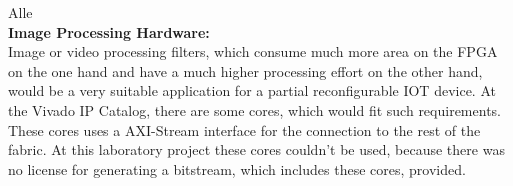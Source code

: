 Alle\\
\textbf{Image Processing Hardware:}\\
Image or video processing filters, which consume much more area on the FPGA on the one hand and have a much higher processing effort on the other hand, would be a very suitable application for a partial reconfigurable IOT device. At the Vivado IP Catalog, there are some cores, which would fit such requirements. These cores uses a AXI-Stream interface for the connection to the rest of the fabric. At this laboratory project these cores couldn't be used, because there was no license for generating a bitstream, which includes these cores, provided.